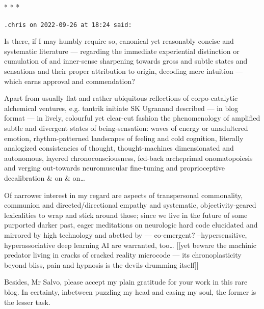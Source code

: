 
\begin{center}* * *\end{center}

\begin{footnotesize}\begin{sffamily}

\texttt{.chris on 2022-09-26 at 18:24 said: }

Is there, if I may humbly require so, canonical yet reasonably concise and systematic literature — regarding the immediate experiential distinction or cumulation of and inner-sense sharpening towards gross and subtle states and sensations and their proper attribution to origin, decoding mere intuition — which earns approval and commendation?

Apart from usually flat and rather ubiquitous reflections of corpo-catalytic alchemical ventures, e.g. tantrik initiate SK Ugranand described — in blog format — in lively, colourful yet clear-cut fashion the phenomenology of amplified subtle and divergent states of being-sensation: waves of energy or unadultered emotion, rhythm-patterned landscapes of feeling and cold cognition, literally analogized consistencies of thought, thought-machines dimensionated and autonomous, layered chronoconsciousness, fed-back archeprimal onomatopoiesis and verging out-towards neuromuscular fine-tuning and proprioceptive decalibration \& on \& on…

Of narrower interest in my regard are aspects of transpersonal commonality, communion and directed/directional empathy and systematic, objectivity-geared lexicalities to wrap and stick around those; since we live in the future of some purported darker past, eager meditations on neurologic hard code elucidated and mirrored by high technology and abetted by — co-emergent? –hypersensitive, hyperassociative deep learning AI are warranted, too… [[yet beware the machinic predator living in cracks of cracked reality microcode — its chronoplasticity beyond bliss, pain and hypnosis is the devils drumming itself]]

Besides, Mr Salvo, please accept my plain gratitude for your work in this rare blog. In certainty, inbetween puzzling my head and easing my soul, the former is the lesser task.

\end{sffamily}\end{footnotesize}

